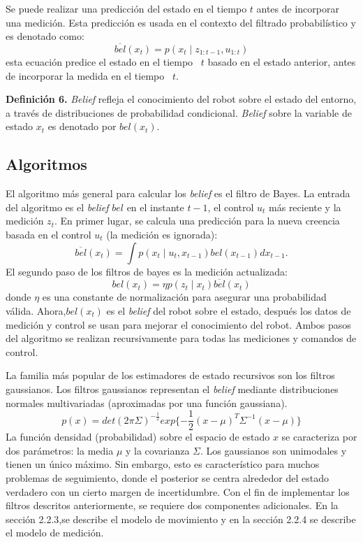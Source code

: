 Se puede realizar una predicción del estado en el tiempo $t$ antes de incorporar una medición. Esta predicción es usada en el contexto del filtrado probabilístico y es denotado como:
\begin{equation}
\overline{bel}(x_{t}) = p(x_{t}\mid z_{1:t-1}, u_{1:t})
\end{equation}
esta ecuación predice el estado en el tiempo ~$t$ basado en el estado anterior, antes de incorporar la medida en el tiempo ~$t$.

\textbf{Definición 6.} \textit{Belief} refleja el conocimiento del robot sobre el estado del entorno, a través de distribuciones de probabilidad condicional. \textit{Belief} sobre la variable de estado $x_{t}$ es denotado por $bel(x_{t})$.


\subsection{Algoritmos}

El algoritmo más general para calcular los \textit{belief} es el filtro de Bayes. La entrada del algoritmo es el \textit{belief} $bel$ en el instante $t-1$, el control $u_{t}$ más reciente y la medición $z_{t}$. En primer lugar, se calcula una predicción para la nueva creencia basada en el control $u_{t}$ (la medición es ignorada):
\begin{equation}
\label{eqn:BF-prediction}
\overline{bel}(x_{t}) = \int p(x_{t}\mid u_{t},x_{t-1})bel(x_{t-1})dx_{t-1}.
\end{equation}
El segundo paso de los filtros de bayes es la medición actualizada:
\begin{equation}
\label{eqn:BF-measurement}
bel(x_{t}) = \eta p(z_{t}\mid x_{t})\overline{bel}(x_{t})
\end{equation}
donde $\eta$ es una constante de normalización para asegurar una probabilidad válida. Ahora,$bel(x_{t})$ es el \textit{belief} del robot sobre el estado, después los datos de medición y control se usan para mejorar el conocimiento del robot. Ambos pasos del algoritmo se realizan recursivamente para todas las mediciones y comandos de control.

La familia más popular de los estimadores de estado recursivos son los filtros gaussianos. Los filtros gaussianos representan el \textit{belief} mediante distribuciones normales multivariadas (aproximadas por una función gaussiana). 
\begin{equation}
p(x)= det(2\pi\Sigma)^{-\frac{1}{2}} exp\{-\frac{1}{2}(x-\mu)^{T}\Sigma^{-1}(x-\mu)\}
\end{equation}
La función densidad (probabilidad) sobre el espacio de estado $x$ se caracteriza por dos parámetros: la media $\mu$ y la covarianza $\Sigma$.
Los gaussianos son unimodales y tienen un único máximo. Sin embargo, esto es característico para muchos problemas de seguimiento, donde el posterior se centra alrededor del estado verdadero con un cierto margen de incertidumbre.
Con el fin de implementar los filtros descritos anteriormente, se requiere dos componentes adicionales. En la sección 2.2.3,se describe el modelo de movimiento y en la sección 2.2.4 se describe el modelo de medición.


